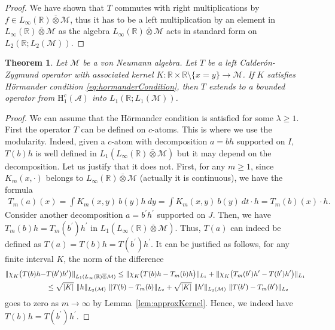 \documentclass[psamsfonts]{amsart}
\newtheorem{theorem}{Theorem}[section]
\newcommand{\R}{\mathbb{R}}
\newcommand*{\bigchi}{\mbox{\large$\chi$}}
\newcommand{\Lone}{L_1}
\newcommand{\Linfty}{L_\infty}
\newcommand{\Ltwo}{L_2}
\newcommand{\Honec}{\mathrm{H}_1^c}
\newcommand{\Hardyc}{\Honec(\mathcal{A})}
\newcommand{\Avnat}{\Linfty(\mathbb{R}) \overline{\otimes} \mathcal{M}}
\begin{document}
\begin{proof}
        We have shown that $T$ commutes with right multiplications by $f\in  \Avnat$, thus it has to be a left multiplication by an element in  $\Avnat$ as the algebra  $\Avnat$ acts in standard form on $\Ltwo(\R;\Ltwo(\mathcal M))$. 
    \end{proof}

    \begin{theorem}\label{main}
        Let $\mathcal{M}$ be a von Neumann algebra. Let $T$ be a left Calder\'on-Zygmund operator with associated kernel $K : \mathbb{R} \times \mathbb{R} \setminus \{x = y\} \rightarrow \mathcal{M}$. If $K$ satisfies Hörmander condition \eqref{eq:hormanderCondition}, then $T$ extends to a bounded operator from $\Hardyc$ into $\Lone(\mathbb{R};\Lone(\mathcal{M}))$.
    \end{theorem}
    \begin{proof}
We can assume that the Hörmander condition is satisfied for some $\lambda\geq 1$.   First the operator $T$ can be defined on $c$-atoms. This is
      where we use the modularity. Indeed, given a $c$-atom with
      decomposition $a=bh$ supported on $I$, $T(b)h$ is well defined
      in $\Lone(\Avnat)$
      but it may depend on the
      decomposition. Let us justify that it does not.  First, for any
      $m\geq 1$, since $K_m(x,\cdot)$ belongs to
      $\Avnat$ (actually it is continuous), we have the formula
  \begin{align*}
            T_m(a)(x) = \int K_m(x,y) \ b(y) h \ dy = \int K_m(x,y) \ b(y) \ dt \cdot h=T_m(b)(x) \cdot h.
        \end{align*}    
         Consider another decomposition $a=b^\prime h^\prime$ supported on $J$. Then, we have $T_m(b)h= T_m(b^\prime)h^\prime$ in $\Lone(\Avnat)$. Thus, $T(a)$ can indeed be defined as $T(a)=T(b)h = T(b^\prime)h^\prime$. It can be justified as follows,  for any finite interval $K$, the norm of the difference
        \begin{align*}
            \|\bigchi_K\big( T(b)h - &T(b^\prime)h^\prime\big)\|_{\Lone(\Linfty(\mathbb{R}) \overline{\otimes} \mathcal{M})} \leq \|\bigchi_K\big(T(b)h - T_m(b)h\big)\|_{\Lone} + \|\bigchi_K\big(T_m(b^\prime)h^\prime - T(b^\prime)h^\prime\big)\|_{\Lone}\\
            &\leq \sqrt{|K|} \ \|h\|_{\Ltwo(\mathcal{M})} \ \|T(b)-T_m(b)\|_{\Ltwo} + \sqrt{|K|} \ \|h^\prime\|_{\Ltwo(\mathcal{M})} \ \|T(b^\prime)-T_m(b^\prime)\|_{\Ltwo} 
        \end{align*}
        goes to zero as $m\to \infty$  by Lemma~\ref{lem:approxKernel}. Hence, we indeed have $T(b)h = T(b^\prime)h^\prime$.


\end{proof}
\end{document}

